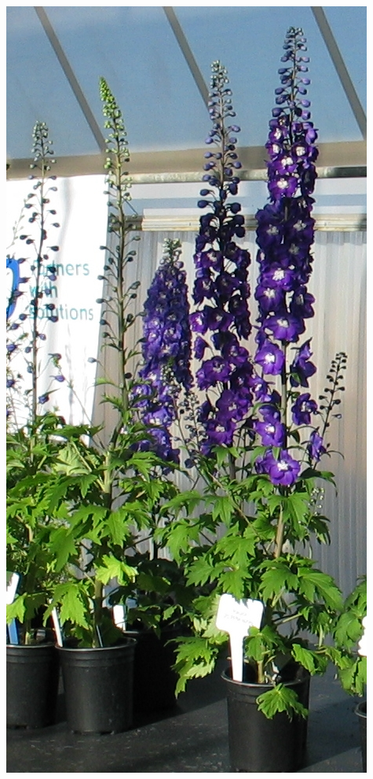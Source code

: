 \documentclass{article}
\begin{document}
\begin{center}
\includegraphics[height=0.9\textheight, angle=90]{../Delphinium.jpg}
\end{center}
\newpage
\end{document}

